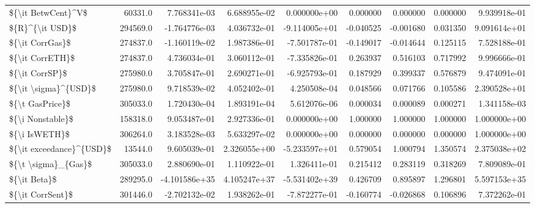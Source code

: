 \begin{tabular}{lrrrrrrrr}
\$\{\textbackslash it BetwCent\}\textasciicircum V\$         &   60331.0 &   7.768341e-03 &  6.688955e-02 &  0.000000e+00 &   0.000000 &   0.000000 &   0.000000 &   9.939918e-01 \\
\$\{R\}\textasciicircum \{\textbackslash it USD\}\$            &  294569.0 &  -1.764776e-03 &  4.036732e-01 & -9.114005e+01 &  -0.040525 &  -0.001680 &   0.031350 &   9.091614e+01 \\
\$\{\textbackslash it CorrGas\}\$            &  274837.0 &  -1.160119e-02 &  1.987386e-01 & -7.501787e-01 &  -0.149017 &  -0.014644 &   0.125115 &   7.528188e-01 \\
\$\{\textbackslash it CorrETH\}\$            &  274837.0 &   4.736034e-01 &  3.060112e-01 & -7.335826e-01 &   0.263937 &   0.516103 &   0.717992 &   9.996666e-01 \\
\$\{\textbackslash it CorrSP\}\$             &  275980.0 &   3.705847e-01 &  2.690271e-01 & -6.925793e-01 &   0.187929 &   0.399337 &   0.576879 &   9.474091e-01 \\
\$\{\textbackslash it \textbackslash sigma\}\textasciicircum \{USD\}\$       &  275980.0 &   9.718539e-02 &  4.052402e-01 &  4.250508e-04 &   0.048566 &   0.071766 &   0.105586 &   2.390528e+01 \\
\$\{\textbackslash t GasPrice\}\$            &  305033.0 &   1.720430e-04 &  1.893191e-04 &  5.612076e-06 &   0.000034 &   0.000089 &   0.000271 &   1.341158e-03 \\
\$\{\textbackslash i Nonstable\}\$           &  158318.0 &   9.053487e-01 &  2.927336e-01 &  0.000000e+00 &   1.000000 &   1.000000 &   1.000000 &   1.000000e+00 \\
\$\{\textbackslash i IsWETH\}\$              &  306264.0 &   3.183528e-03 &  5.633297e-02 &  0.000000e+00 &   0.000000 &   0.000000 &   0.000000 &   1.000000e+00 \\
\$\{\textbackslash it exceedance\}\textasciicircum \{USD\}\$   &   13544.0 &   9.605039e-01 &  2.326055e+00 & -5.233597e+01 &   0.579054 &   1.000794 &   1.350574 &   2.375038e+02 \\
\$\{\textbackslash t \textbackslash sigma\}\_\{Gas\}\$        &  305033.0 &   2.880690e-01 &  1.110922e-01 &  1.326411e-01 &   0.215412 &   0.283119 &   0.318269 &   7.809089e-01 \\
\$\{\textbackslash it Beta\}\$               &  289295.0 &  -4.101586e+35 &  4.105247e+37 & -5.531402e+39 &   0.426709 &   0.895897 &   1.296801 &   5.597153e+35 \\
\$\{\textbackslash it CorrSent\}\$           &  301446.0 &  -2.702132e-02 &  1.938262e-01 & -7.872277e-01 &  -0.160774 &  -0.026868 &   0.106896 &   7.372262e-01 \\

\end{tabular}
